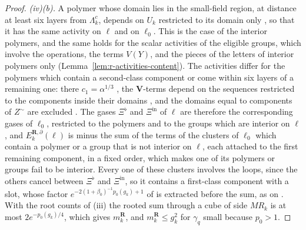 \documentclass[11pt]{preprint}
\numberwithin{equation}{section}
\theoremstyle{definition}
\theoremstyle{remark}
\theoremstyle{plain}
\begin{document}
\begin{proof}
\emph{(iv)(b).} A polymer whose domain lies in the small-field region, at distance at least six layers from $\Lambda_k^c$, depends on $U_k$ restricted to its domain only \cite[pp.~377, 379]{BalabanLFR2}, so that it has the same activity on $\ell$ and on $\ell_0$. This is the case of the interior polymers, and the same holds for the scalar activities of the eligible groups, which involve the operations, the terms $V(Y)$, and the pieces of the letters of interior polymers only (Lemma~\ref{lem:r-activities-content}). The activities differ for the polymers which contain a second-class component or come within six layers of a remaining one: there $c_1 = \alpha^{1/3}$ \cite[p.~390]{BalabanLFR2}, the $\mathbf V$-terms depend on the sequences restricted to the components inside their domains \cite[p.~379]{BalabanLFR2}, and the domains equal to components of $Z^\sim$ are excluded \cite[p.~379]{BalabanLFR2}. The gases $\Xi^\flat$ and $\Xi^{\mathrm{in}}$ of $\ell$ are therefore the corresponding gases of $\ell_0$, restricted to the polymers and to the groups which are interior on $\ell$, and $E^{\mathbf R,\partial}_k(\ell)$ is minus the sum of the terms of the clusters of $\ell_0$ which contain a polymer or a group that is not interior on $\ell$, each attached to the first remaining component, in a fixed order, which makes one of its polymers or groups fail to be interior. Every one of these clusters involves the loops, since the others cancel between $\Xi^\flat$ and $\Xi^{\mathrm{in}}$, so it contains a first-class component with a slot, whose factor $e^{-2(1+\beta_0)^{-1}p_0(g_k)+1}$ of \cite[(1.89), p.~387]{BalabanLFR2} is extracted before the sum, as on \cite[p.~389]{BalabanLFR2}. With the root counts of (iii) the rooted sum through a cube of side $MR_k$ is at most $2e^{-p_0(g_k)/4}$, which gives $m^{\mathbf R}_k$, and $m^{\mathbf R}_k \leq g_k^2$ for $\gamma_q$ small because $p_0 > 1$.


\end{proof}
\end{document}
